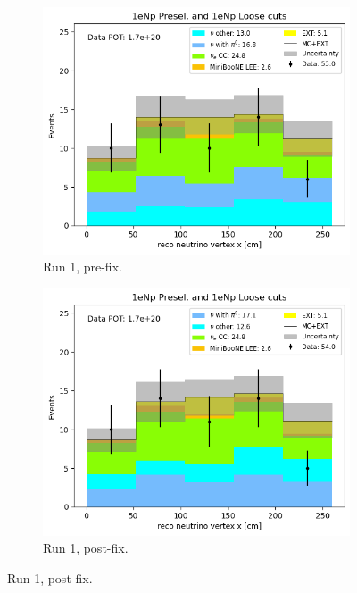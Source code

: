 \begin{figure}[H]
    \centering
    \begin{subfigure}{0.5\linewidth}
        \includegraphics[width=\linewidth]{technote/SystematicsSensitivity/Figures/Run1_Vertex_X_Alex.png}
        \caption{Run 1, pre-fix.}
    \end{subfigure}%
    \begin{subfigure}{0.5\linewidth}
        \includegraphics[width=\linewidth]{technote/SystematicsSensitivity/Figures/Run1_Vertex_X_Alex_BugFix.png}
        \caption{Run 1, post-fix.}
    \end{subfigure}

\end{figure}
